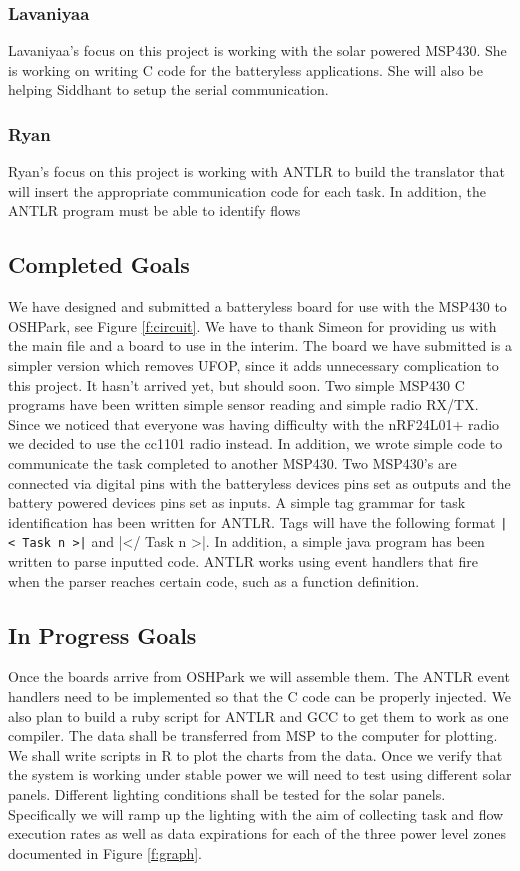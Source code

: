 \subsubsection{Lavaniyaa}
Lavaniyaa's focus on this project is working with the solar powered MSP430.
She is working on writing C code for the batteryless applications.
She will also be helping Siddhant to setup the serial communication.

\subsubsection{Ryan}
Ryan's focus on this project is working with ANTLR to build the translator that will insert the appropriate communication code for each task.
In addition, the ANTLR program must be able to identify flows

\subsection{Completed Goals}

We have designed and submitted a batteryless board for use with the MSP430 to OSHPark, see Figure \ref{f:circuit}.
We have to thank Simeon for providing us with the main file and a board to use in the interim.
The board we have submitted is a simpler version which removes UFOP, since it adds unnecessary complication to this project.
It hasn't arrived yet, but should soon.
Two simple MSP430 C programs have been written simple sensor reading and simple radio RX/TX.
Since we noticed that everyone was having difficulty with the nRF24L01+ radio we decided to use the cc1101 radio instead.
In addition, we wrote simple code to communicate the task completed to another MSP430.
Two MSP430's are connected via digital pins with the batteryless devices pins set as outputs and the battery powered devices pins set as inputs.
A simple tag grammar for task identification has been written for ANTLR.
Tags will have the following format {\tt |< Task n >|} and |</ Task n >|.
In addition, a simple java program has been written to parse inputted code.
ANTLR works using event handlers that fire when the parser reaches certain code, such as a function definition.

\subsection{In Progress Goals}


Once the boards arrive from OSHPark we will assemble them.
The ANTLR event handlers need to be implemented so that the C code can be properly injected.
We also plan to build a ruby script for ANTLR and GCC to get them to work as one compiler.
The data shall be transferred from MSP to the computer for plotting.
We shall write scripts in R to plot the charts from the data.
Once we verify that the system is working under stable power we will need to test using different solar panels.
Different lighting conditions shall be tested for the solar panels.
Specifically we will ramp up the lighting with the aim of collecting task and flow execution rates as well as data expirations for each of the three power level zones documented in Figure \ref{f:graph}.



